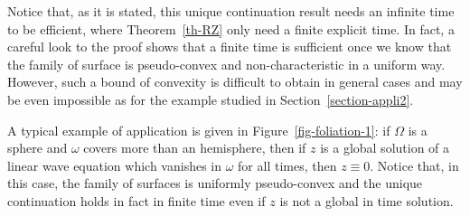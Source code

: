 Notice that, as it is stated, this unique continuation result needs an infinite time to be efficient, where Theorem~\ref{th-RZ} only need a finite explicit time. In fact, a careful look to the proof shows that a finite time is sufficient once we know that the family of surface is pseudo-convex and non-characteristic in a uniform way. However, such a bound of convexity is difficult to obtain in general cases and may be even impossible as for the example studied in Section~\ref{section-appli2}.


A typical example of application is given in Figure~\ref{fig-foliation-1}: if $\Omega$ is a sphere and $\omega$ covers more than an hemisphere, then if $z$ is a global solution of a linear wave equation which vanishes in $\omega$ for all times, then $z\equiv 0$. Notice that, in this case, the family of surfaces is uniformly pseudo-convex and the unique continuation holds in fact in finite time even if $z$ is not a global in time solution.



